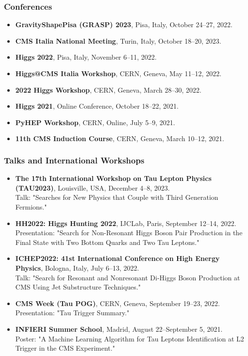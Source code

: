 \documentclass[12pt,a4paper,oneside]{extarticle}
\begin{document}
\subsubsection*{Conferences}
\begin{itemize}
    \item \textbf{GravityShapePisa (GRASP) 2023}, Pisa, Italy, October 24–27, 2022.
    \item \textbf{CMS Italia National Meeting}, Turin, Italy, October 18–20, 2023.
    \item \textbf{Higgs 2022}, Pisa, Italy, November 6–11, 2022.
    \item \textbf{Higgs@CMS Italia Workshop}, CERN, Geneva, May 11–12, 2022.
    \item \textbf{2022 Higgs Workshop}, CERN, Geneva, March 28–30, 2022.
    \item \textbf{Higgs 2021}, Online Conference, October 18–22, 2021.
    \item \textbf{PyHEP Workshop}, CERN, Online, July 5–9, 2021.
    \item \textbf{11th CMS Induction Course}, CERN, Geneva, March 10–12, 2021.
\end{itemize}


\subsubsection*{Talks and International Workshops}
\begin{itemize}
    \item \textbf{The 17th International Workshop on Tau Lepton Physics (TAU2023)}, Louisville, USA, December 4–8, 2023.\\
    Talk: "Searches for New Physics that Couple with Third Generation Fermions."
    \item \textbf{HH2022: Higgs Hunting 2022}, IJCLab, Paris, September 12–14, 2022.\\
    Presentation: "Search for Non-Resonant Higgs Boson Pair Production in the Final State with Two Bottom Quarks and Two Tau Leptons."
    \item \textbf{ICHEP2022: 41st International Conference on High Energy Physics}, Bologna, Italy, July 6–13, 2022.\\
    Talk: "Search for Resonant and Nonresonant Di-Higgs Boson Production at CMS Using Jet Substructure Techniques."
    \item \textbf{CMS Week (Tau POG)}, CERN, Geneva, September 19–23, 2022.\\
    Presentation: "Tau Trigger Summary."
    \item \textbf{INFIERI Summer School}, Madrid, August 22–September 5, 2021.\\
    Poster: "A Machine Learning Algorithm for Tau Leptons Identification at L2 Trigger in the CMS Experiment."
\end{itemize}
\end{document}
